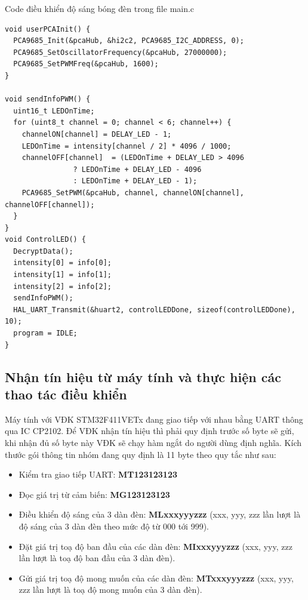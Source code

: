 Code điều khiển độ sáng bóng đèn trong file main.c
\begin{lstlisting}
void userPCAInit() {
  PCA9685_Init(&pcaHub, &hi2c2, PCA9685_I2C_ADDRESS, 0);
  PCA9685_SetOscillatorFrequency(&pcaHub, 27000000);
  PCA9685_SetPWMFreq(&pcaHub, 1600);
}

void sendInfoPWM() {
  uint16_t LEDOnTime;
  for (uint8_t channel = 0; channel < 6; channel++) {
    channelON[channel] = DELAY_LED - 1;
    LEDOnTime = intensity[channel / 2] * 4096 / 1000;
    channelOFF[channel]  = (LEDOnTime + DELAY_LED > 4096
                ? LEDOnTime + DELAY_LED - 4096
                : LEDOnTime + DELAY_LED - 1);
    PCA9685_SetPWM(&pcaHub, channel, channelON[channel], channelOFF[channel]);
  }
}
void ControlLED() {
  DecryptData();
  intensity[0] = info[0];
  intensity[1] = info[1];
  intensity[2] = info[2];
  sendInfoPWM();
  HAL_UART_Transmit(&huart2, controlLEDDone, sizeof(controlLEDDone), 10);
  program = IDLE;
}
\end{lstlisting}

\subsection{Nhận tín hiệu từ máy tính và thực hiện các thao tác điều khiển}
Máy tính với VĐK STM32F411VETx đang giao tiếp với nhau bằng UART thông qua IC CP2102.
Để VĐK nhận tín hiệu thì phải quy định trước số byte sẽ gửi, khi nhận đủ số byte này VĐK sẽ chạy hàm ngắt do người dùng định nghĩa. Kích thước gói thông tin nhóm đang quy định là 11 byte theo quy tắc như sau:
\begin{itemize}
\item Kiểm tra giao tiếp UART: \textbf{MT123123123}
\item Đọc giá trị từ cảm biến: \textbf{MG123123123}
\item Điều khiển độ sáng của 3 dàn đèn: \textbf{MLxxxyyyzzz} (xxx, yyy, zzz lần lượt là độ sáng của 3 dàn đèn theo mức độ từ 000 tới 999).
\item Đặt giá trị toạ độ ban đầu của các dàn đèn: \textbf{MIxxxyyyzzz} (xxx, yyy, zzz lần lượt là toạ độ ban đầu của 3 dàn đèn).
\item Gửi giá trị toạ độ mong muốn của các dàn đèn: \textbf{MTxxxyyyzzz} (xxx, yyy, zzz lần lượt là toạ độ mong muốn của 3 dàn đèn).
\end{itemize}

